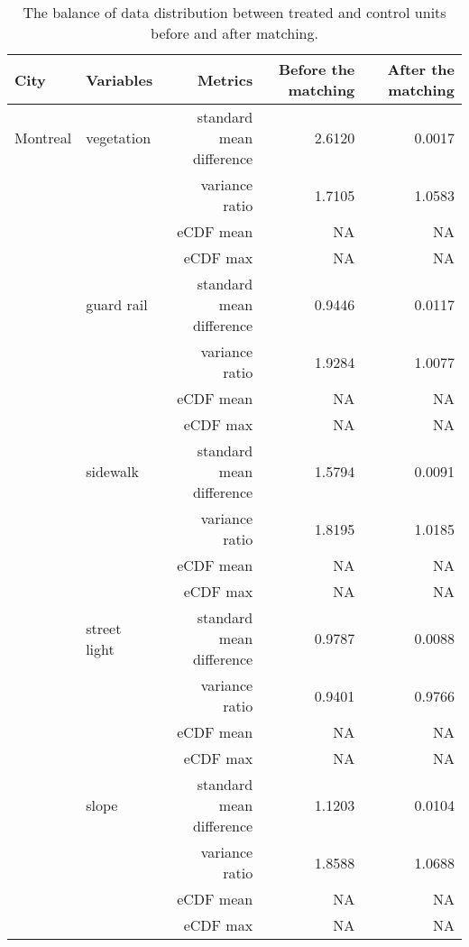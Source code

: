 \begin{table}[!htp]\centering
\caption{The balance of data distribution between treated and control units before and after matching.}\label{result:tab:match_result}
\scriptsize
\begin{tabular}{llrrr}\toprule
City&Variables&Metrics&Before the matching &After the matching \\\midrule

Montreal & vegetation & standard mean difference & 2.6120 & \cellcolor{customgreen} 0.0017 \\
 &  & variance ratio & 1.7105 & \cellcolor{customgreen} 1.0583 \\
 &  & eCDF mean & NA &  NA \\
 &  & eCDF max & NA &  NA \\
 & guard rail & standard mean difference & 0.9446 & \cellcolor{customgreen} 0.0117 \\
 &  & variance ratio & 1.9284 & \cellcolor{customgreen} 1.0077 \\
 &  & eCDF mean & NA &  NA \\
 &  & eCDF max & NA &  NA \\
 & sidewalk & standard mean difference & 1.5794 & \cellcolor{customgreen} 0.0091 \\
 &  & variance ratio & 1.8195 & \cellcolor{customgreen} 1.0185 \\
 &  & eCDF mean & NA &  NA \\
 &  & eCDF max & NA &  NA \\
 & street light & standard mean difference & 0.9787 & \cellcolor{customgreen} 0.0088 \\
 &  & variance ratio & 0.9401 & \cellcolor{customgreen} 0.9766 \\
 &  & eCDF mean & NA &  NA \\
 &  & eCDF max & NA &  NA \\
 & slope & standard mean difference & 1.1203 & \cellcolor{customgreen} 0.0104 \\
 &  & variance ratio & 1.8588 & \cellcolor{customgreen} 1.0688 \\
 &  & eCDF mean & NA &  NA \\
 &  & eCDF max & NA &  NA \\
\bottomrule
\end{tabular}
\end{table}

